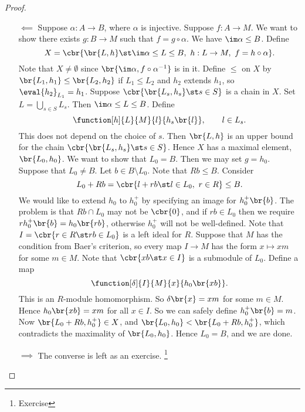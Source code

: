 \begin{proof}
\hfill
\begin{itemize}
\item[$ \impliedby $] Suppose $ \alpha : A \to B $, where $ \alpha $ is injective. Suppose $ f : A \to M $. We want to show there exists $ g : B \to M $ such that $ f = g \circ \alpha $. We have $ \im \alpha \le B $. Define
$$ X = \cbr{\br{L, h} \st \im \alpha \le L \le B, \ h : L \to M, \ f = h \circ \alpha}. $$
Note that $ X \ne \emptyset $ since $ \br{\im \alpha, f \circ \alpha^{-1}} $ is in it. Define $ \le $ on $ X $ by $ \br{L_1, h_1} \le \br{L_2, h_2} $ if $ L_1 \le L_2 $ and $ h_2 $ extends $ h_1 $, so $ \eval{h_2}_{L_1} = h_1 $. Suppose $ \cbr{\br{L_s, h_s} \st s \in S} $ is a chain in $ X $. Set $ L = \bigcup_{s \in S} L_s $. Then $ \im \alpha \le L \le B $. Define
$$ \function[h]{L}{M}{l}{h_s\br{l}}, \qquad l \in L_s. $$
This does not depend on the choice of $ s $. Then $ \br{L, h} $ is an upper bound for the chain $ \cbr{\br{L_s, h_s} \st s \in S} $. Hence $ X $ has a maximal element, $ \br{L_0, h_0} $. We want to show that $ L_0 = B $. Then we may set $ g = h_0 $. Suppose that $ L_0 \ne B $. Let $ b \in B \setminus L_0 $. Note that $ Rb \le B $. Consider
$$ L_0 + Rb = \cbr{l + rb \st l \in L_0, \ r \in R} \le B. $$
We would like to extend $ h_0 $ to $ h_0^+ $ by specifying an image for $ h_0^+\br{b} $. The problem is that $ Rb \cap L_0 $ may not be $ \cbr{0} $, and if $ rb \in L_0 $ then we require $ rh_0^+\br{b} = h_0\br{rb} $, otherwise $ h_0^+ $ will not be well-defined. Note that $ I = \cbr{r \in R \st rb \in L_0} $ is a left ideal for $ R $. Suppose that $ M $ has the condition from Baer's criterion, so every map $ I \to M $ has the form $ x \mapsto xm $ for some $ m \in M $. Note that $ \cbr{xb \st x \in I} $ is a submodule of $ L_0 $. Define a map
$$ \function[\delta]{I}{M}{x}{h_0\br{xb}}. $$
This is an $ R $-module homomorphism. So $ \delta\br{x} = xm $ for some $ m \in M $. Hence $ h_0\br{xb} = xm $ for all $ x \in I $. So we can safely define $ h_0^+\br{b} = m $. Now $ \br{L_0 + Rb, h_0^+} \in X $, and $ \br{L_0, h_0} < \br{L_0 + Rb, h_0^+} $, which contradicts the maximality of $ \br{L_0, h_0} $. Hence $ L_0 = B $, and we are done.
\item[$ \implies $] The converse is left as an exercise. \footnote{Exercise}
\end{itemize}
\end{proof}

